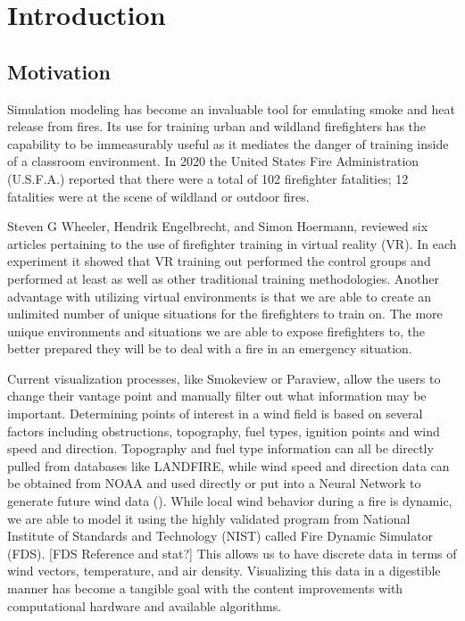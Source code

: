 
\chapter{Introduction} %

\label{ChapterX} %


\section{Motivation}

Simulation modeling has become an invaluable tool for emulating smoke and heat release from fires. Its use for training urban and wildland firefighters has the capability to be immeasurably useful as it mediates the danger of training inside of a classroom environment. In 2020 the United States Fire Administration (U.S.F.A.) reported that there were a total of 102 firefighter fatalities; 12 fatalities were at the scene of wildland or outdoor fires. \cite{FireFatalities}

Steven G Wheeler, Hendrik Engelbrecht, and Simon Hoermann, reviewed six articles pertaining to the use of firefighter training in virtual reality (VR).\cite{Wheeler2021}  In each experiment it showed that VR training out performed the control groups and performed at least as well as other traditional training methodologies. Another advantage with utilizing virtual environments is that we are able to create an unlimited number of unique situations for the firefighters to train on. The more unique environments and situations we are able to expose firefighters to, the better prepared they will be to deal with a fire in an emergency situation. 
\par
Current visualization processes, like Smokeview or Paraview, allow the users to change their vantage point and manually filter out what information may be important. Determining points of interest in a wind field is based on several factors including obstructions, topography, fuel types, ignition points and wind speed and direction. Topography and fuel type information can all be directly pulled from databases like LANDFIRE, while wind speed and direction data can be obtained from NOAA and used directly or  put into a Neural Network to generate future wind data (\cite{WindNN}). While local wind behavior during a fire is dynamic, we are able to model it using the highly validated program from National Institute of Standards and Technology (NIST) called Fire Dynamic Simulator (FDS). \color{red}[FDS Reference and stat?]\color{black} This allows us to have discrete data in terms of wind vectors, temperature, and air density. Visualizing this data in a digestible manner has become a tangible goal with the content improvements with computational hardware and available algorithms.   




